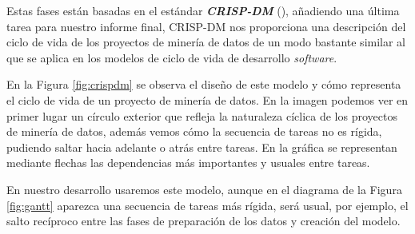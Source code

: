 Estas fases están basadas en el estándar \textbf{\textit{CRISP-DM}} (\cite{crispdm}), añadiendo una última tarea para nuestro informe final, CRISP-DM nos proporciona una descripción del ciclo de vida de los proyectos de minería de datos de un modo bastante similar al que se aplica en los modelos de ciclo de vida de desarrollo \textit{software}.


 

En la Figura \ref{fig:crispdm} se observa el diseño de este modelo y cómo representa el ciclo de vida de un proyecto de minería de datos. En la imagen podemos ver en primer lugar un círculo exterior que refleja la naturaleza cíclica de los proyectos de minería de datos, además vemos cómo la secuencia de tareas no es rígida, pudiendo saltar hacia adelante o atrás entre tareas. En la gráfica se representan mediante flechas las dependencias más importantes y usuales entre tareas.

En nuestro desarrollo usaremos este modelo, aunque en el diagrama de la Figura \ref{fig:gantt} aparezca una secuencia de tareas más rígida, será usual, por ejemplo, el salto recíproco entre las fases de preparación de los datos y creación del modelo.



